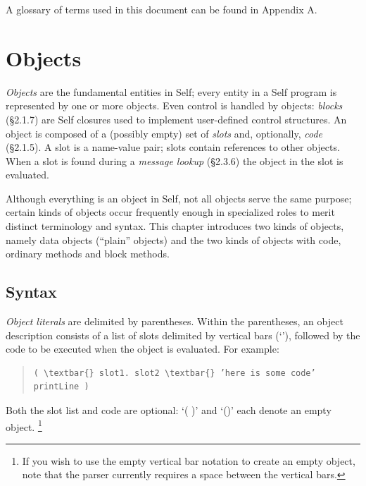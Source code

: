 \documentclass[letterpaper,10pt,english]{sphinxmanual}
\begin{document}
A glossary of terms used in this document can be found in Appendix A.


\section{Objects}
\label{langref:objects}\label{langref:index-2}
\emph{Objects} are the fundamental entities in Self; every entity in a Self program is represented by one
or more objects. Even control is handled by objects: \emph{blocks} (\S{}2.1.7) are Self closures used to implement
user-defined control structures. An object is composed of a (possibly empty) set of \emph{slots}
and, optionally, \emph{code} (\S{}2.1.5). A slot is a name-value pair; slots contain references to other objects.
When a slot is found during a \emph{message lookup} (\S{}2.3.6) the object in the slot is evaluated.

Although everything is an object in Self, not all objects serve the same purpose; certain kinds of
objects occur frequently enough in specialized roles to merit distinct terminology and syntax. This
chapter introduces two kinds of objects, namely data objects (“plain” objects) and the two kinds of
objects with code, ordinary methods and block methods.


\subsection{Syntax}
\label{langref:syntax}\label{langref:index-3}
\emph{Object literals} are delimited by parentheses. Within the parentheses, an object description consists
of a list of slots delimited by vertical bars (‘\textbar{}’), followed by the code to be executed when the object
is evaluated. For example:
\begin{quote}

\begin{Verbatim}[commandchars=\\\{\}]
( \textbar{} slot1. slot2 \textbar{} ’here is some code’ printLine )
\end{Verbatim}
\end{quote}

Both the slot list and code are optional: ‘( \textbar{} \textbar{} )’ and ‘()’ each denote an empty object. \footnote{
If you wish to use the empty vertical bar notation to create an empty object, note that the parser currently requires a space between the vertical bars.
}
\end{document}
